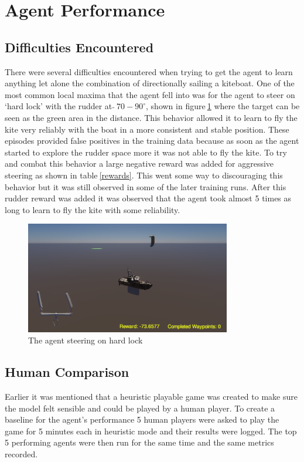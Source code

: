 \section{Agent Performance}

\subsection*{Difficulties Encountered}
There were several difficulties encountered when trying to get the agent to learn anything let alone the combination of directionally sailing a kiteboat. One of the most common local maxima that the agent fell into was for the agent to steer on `hard lock' with the rudder at \textit{$\tilde{} ~70-90^{\circ}$}, shown in figure$~$\ref{hard_lock} where the target can be seen as the green area in the distance. This behavior allowed it to learn to fly the kite very reliably with the boat in a more consistent and stable position. These episodes provided false positives in the training data because as soon as the agent started to explore the rudder space more it was not able to fly the kite. To try and combat this behavior a large negative reward was added for aggressive steering as shown in table$~$\ref{rewards}. This went some way to discouraging this behavior but it was still observed in some of the later training runs. After this rudder reward was added it was observed that the agent took almost 5 times as long to learn to fly the kite with some reliability. 

\begin{figure}[!htb]
    \centering
    \includegraphics[width=0.8\textwidth]{Images/hard_lock.png}
    \caption{The agent steering on hard lock}\label{hard_lock}
\end{figure}


\subsection{Human Comparison}
Earlier it was mentioned that a heuristic playable game was created to make sure the model felt sensible and could be played by a human player. To create a baseline for the agent's performance 5 human players were asked to play the game for 5 minutes each in heuristic mode and their results were logged. The top 5 performing agents were then run for the same time and the same metrics recorded. 




